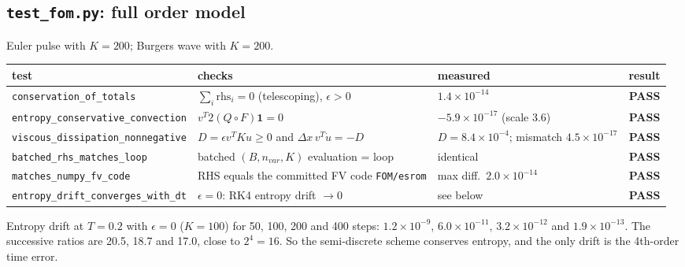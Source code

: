 \documentclass[11pt,a4paper]{article}
\newcommand{\code}[1]{\texttt{\small #1}}
\newcommand{\pass}{\textcolor{green!45!black}{\textbf{PASS}}}
\begin{document}
\subsection{\code{test\_fom.py}: full order model}
Euler pulse with $K=200$; Burgers wave with $K=200$.
\begin{center}\small
\begin{tabular}{p{4.3cm}p{5.2cm}p{3.7cm}c}
\toprule
test & checks & measured & result\\\midrule
\code{conservation\_of\_totals} & $\sum_i\mathrm{rhs}_i=0$ (telescoping), $\epsilon>0$ & $1.4\times10^{-14}$ & \pass\\
\code{entropy\_conservative\_convection} & $v^T2(Q\circ F)\mathbf 1=0$ & $-5.9\times10^{-17}$ (scale 3.6) & \pass\\
\code{viscous\_dissipation\_nonnegative} & $D=\epsilon v^TKu\ge0$ and $\Delta x\,v^T\dot u=-D$ & $D=8.4\times10^{-4}$; mismatch $4.5\times10^{-17}$ & \pass\\
\code{batched\_rhs\_matches\_loop} & batched $(B,n_{var},K)$ evaluation = loop & identical & \pass\\
\code{matches\_numpy\_fv\_code} & RHS equals the committed FV code \code{FOM/esrom} & max diff.\ $2.0\times10^{-14}$ & \pass\\
\code{entropy\_drift\_converges\_with\_dt} & $\epsilon=0$: RK4 entropy drift $\to0$ & see below & \pass\\
\bottomrule
\end{tabular}
\end{center}
Entropy drift at $T=0.2$ with $\epsilon=0$ ($K=100$) for 50, 100, 200 and 400 steps: $1.2\times10^{-9}$, $6.0\times10^{-11}$, $3.2\times10^{-12}$ and $1.9\times10^{-13}$. The successive ratios are 20.5, 18.7 and 17.0, close to $2^4=16$. So the semi-discrete scheme conserves entropy, and the only drift is the 4th-order time error.
\end{document}
